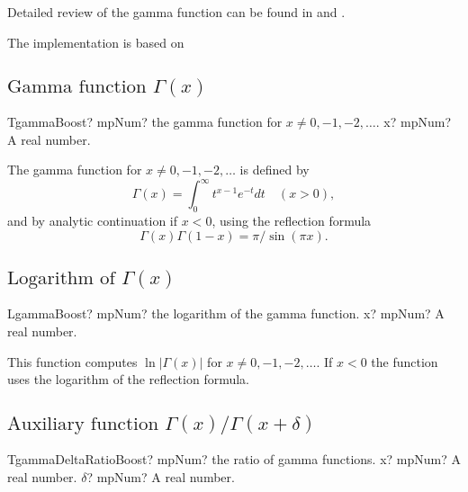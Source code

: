 Detailed review of the gamma function can be found in \cite{pugh_2004} and \cite{Luschny2012}.

The implementation is based on \cite{boost_math}


\subsection{\texorpdfstring{$\text{Gamma function }\Gamma(x)$}{TGamma}}

\begin{mpFunctionsExtract}
	\mpFunctionOne
	{TgammaBoost? mpNum? the gamma function for $x \neq 0, -1, -2,\ldots$.}
	{x? mpNum? A real number.}
\end{mpFunctionsExtract}

\vspace{0.3cm}
The gamma function for $x \neq 0, -1, -2,\ldots$ is defined by
\begin{equation}
	\Gamma(x)  = \int_{0}^{\infty} t^{x-1} e^{-t} dt \quad (x>0),
\end{equation}
and by analytic continuation if $x<0$, using the reflection formula
\begin{equation}
	\Gamma(x) \Gamma(1-x)  = \pi / \sin(\pi x).
\end{equation}




\subsection{\texorpdfstring{$\text{Logarithm of }\Gamma(x)$}{Lgamma}}

\begin{mpFunctionsExtract}
	\mpFunctionOne
	{LgammaBoost? mpNum? the logarithm of the gamma function.}
	{x? mpNum? A real number.}
\end{mpFunctionsExtract}

\vspace{0.3cm}
This function computes $\ln|\Gamma(x)|$ for $x \neq 0, -1, -2, \ldots$. If $x<0$ the function uses the logarithm of the reflection formula.


\subsection{\texorpdfstring{$\text{Auxiliary function }\Gamma(x) / \Gamma(x+\delta)$}{TgammaDeltaRatio}}

\begin{mpFunctionsExtract}
	\mpFunctionTwo
	{TgammaDeltaRatioBoost? mpNum?  the ratio of gamma functions.}
	{x? mpNum? A real number.}
	{$\delta$? mpNum? A real number.}
\end{mpFunctionsExtract}

